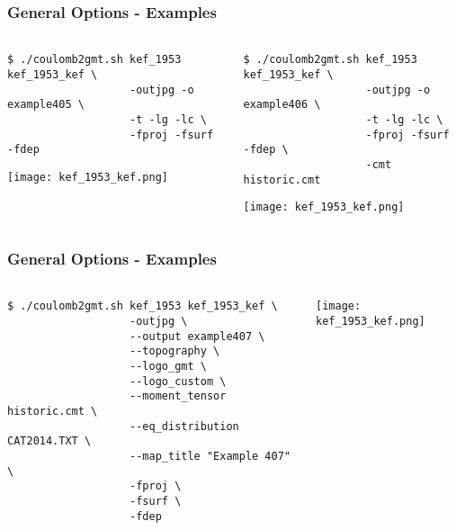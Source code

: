 \begin{frame}[t,fragile]
  \frametitle{General Options - Examples}
  \framesubtitle{}
  \label{fr4:hist_pics}
\begin{columns}[t]
  \begin{column}{.5\textwidth}
\begin{scriptsize}
\begin{verbatim}
$ ./coulomb2gmt.sh kef_1953 kef_1953_kef \
                   -outjpg -o example405 \
                   -t -lg -lc \
                   -fproj -fsurf -fdep
\end{verbatim}
\end{scriptsize}
\centering
\texttt{[image: kef\_1953\_kef.png]}
  \end{column}
  \begin{column}{.5\textwidth}
  \begin{scriptsize}
\begin{verbatim}
$ ./coulomb2gmt.sh kef_1953 kef_1953_kef \
                   -outjpg -o example406 \
                   -t -lg -lc \
                   -fproj -fsurf -fdep \
                   -cmt historic.cmt
\end{verbatim}
\end{scriptsize}
\centering
  \texttt{[image: kef\_1953\_kef.png]}
  \end{column}
\end{columns}

\end{frame}
\note{}

\begin{frame}[t,fragile]
  \frametitle{General Options - Examples}
  \framesubtitle{}
  \label{fr4:hist_pics}
\begin{columns}[t]
  \begin{column}{.5\textwidth}
\begin{scriptsize}
\begin{verbatim}
$ ./coulomb2gmt.sh kef_1953 kef_1953_kef \
                   -outjpg \ 
                   --output example407 \
                   --topography \
                   --logo_gmt \
                   --logo_custom \
                   --moment_tensor historic.cmt \
                   --eq_distribution CAT2014.TXT \
                   --map_title "Example 407" \
                   -fproj \
                   -fsurf \
                   -fdep
\end{verbatim}
\end{scriptsize}

  \end{column}
  \begin{column}{.5\textwidth}

\centering
  \texttt{[image: kef\_1953\_kef.png]}
  \end{column}
\end{columns}

\end{frame}
\note{}

